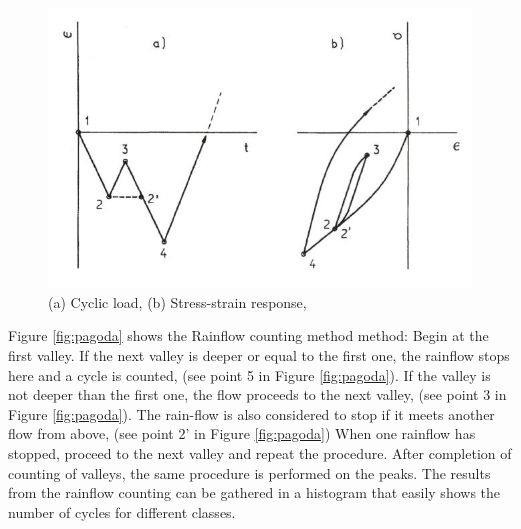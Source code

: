 \begin{figure}[H]
\centering
\includegraphics[scale=0.7]{figures/count}
\caption[$\; \:$Cyclic load and stress-strain response]{(a) Cyclic load, (b) Stress-strain response,   \cite{fatigue2016} }
 \label{fig:count}
\end{figure}

\noindent Figure \ref{fig:pagoda} shows the Rainflow counting method method:\newline 
\newline
Begin at the first valley. If the next valley is deeper or equal to the first one, the rainflow stops here and a cycle is counted, (see point 5 in Figure \ref{fig:pagoda}). If the valley is not deeper than the first one, the flow proceeds to the next valley, (see point 3 in Figure \ref{fig:pagoda}). The rain-flow is also considered to stop if it meets another flow from above, (see point 2' in Figure \ref{fig:pagoda}) When one rainflow has stopped, proceed to the next valley and repeat the procedure. After completion of counting of valleys, the same procedure is performed on the peaks. The results from the rainflow counting can be gathered in a histogram that easily shows the number of cycles for different classes. 

